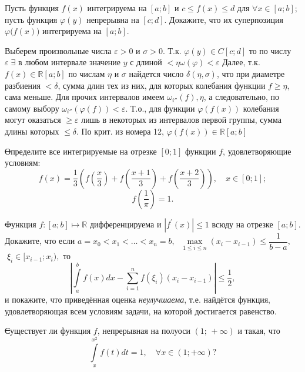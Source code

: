 \documentclass[10pt]{article}
\begin{document}
\pnt Пусть функция $f(x)$ интегрируема на $[a; b]$ и $c \le f(x) \le d$ для $\forall x \in [a; b]$; пусть функция $\varphi(y)$ непрерывна на $[c; d].$ Докажите, что их суперпозиция $\varphi \bigl(f(x)\bigr)$ интегрируема на $[a; b]$.
\begin{solution}
  Выберем произвольные числа $\varepsilon>0$ и $\sigma>0$. Т.к. $\varphi(y)\in C[c;d]$ то по числу $\varepsilon\;\exists$ в любом интервале значение $y$  с длиной $<\eta \omega(\varphi)<\varepsilon$\newline
   Далее, т.к. $f(x)\in\mathds{R}[a;b]$ по числам $\eta$ и $\sigma$ найдется число $\delta(\eta, \sigma)$, что при диаметре разбиения $<\delta$, сумма длин тех из них, для которых колебания функции $f\geqslant \eta$, сама меньше. Для прочих интервалов имеем $\omega_{i''}(f),\eta$, а следовательно, по самому выбору $\omega_{i''}(\varphi(f))<\varepsilon$. Т.о., для функции $\varphi(f(x))$ колебания могут оказаться $\geqslant\varepsilon$ лишь в некоторых из интервалов первой группы, сумма длины которых $\leqslant\delta$. По крит. из номера 12, $\varphi(f(x))\in\mathds{R}[a;b]$
\end{solution}


\vspace{-1ex}
\task \st Определите все интегрируемые на отрезке $[0; 1]$ функции $f$, удовлетворяющие условиям:
\vspace{-0ex}
$$
f(x) = \dfrac{1}{3} \left(f\left(\frac{x}{3}\right) + f\left(\frac{x+1}{3}\right) + f\left(\frac{x+2}{3}\right)\right), \quad x \in [0; 1];
$$
$$
f\left(\frac{1}{\pi}\right) = 1.
$$
\vspace{-4ex}

\task \st Функция $f : [a; b] \mapsto \mathbb{R}$ дифференцируема и $|f^{\prime}(x)| \le 1$ всюду на отрезке $[a; b].$ Докажите, что если $a = x_0 < x_1 < \ldots < x_n = b,$ $\; \max\limits_{1 \le i \le n} (x_i - x_{i-1}) \le \dfrac{1}{b-a},$ $\; \xi_i \in [x_{i-1}; x_i),$ то
$$
\left| \int\limits_a^b f(x) dx - \sum\limits_{i=1}^n f(\xi_i) (x_i - x_{i-1}) \right| \le \dfrac{1}{2},
$$
и покажите, что приведённая оценка \emph{неулучшаема}, т.е. найдётся функция, удовлетворяющая всем условиям задачи, на которой достигается равенство.
\vspace{-2ex}

\task \st Существует ли функция $f$, непрерывная на полуоси $(1; \, +\infty)$ и такая, что
$$
\int\limits_x^{x^2} f(t) dt = 1, \quad \forall x \in (1; +\infty) ?
$$
\end{document}
